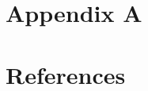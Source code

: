 \documentclass[12pt,a4paper,english,nofootinbib,sort&compress,numbers]{revtex4-2} %
\begin{document}
\newpage
 \section*{Appendix A}\label{sec:AppendixA}
%
\label{sec:appendix}




\onecolumngrid

\clearpage

\section*{References}


\end{document}
